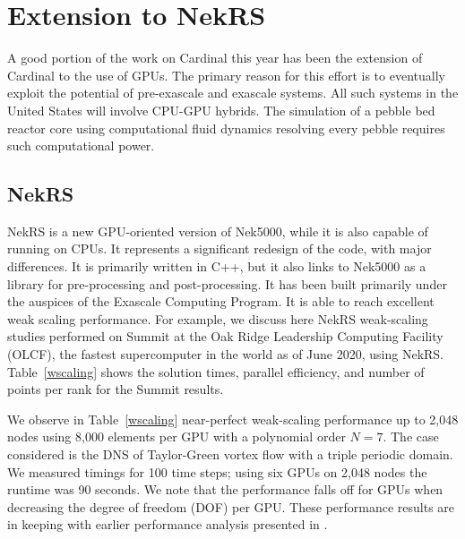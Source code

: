 \section{Extension to NekRS}
\label{s:nrs}

A good portion of the work on Cardinal this year has been the extension of Cardinal to the use of GPUs. The primary reason for this effort is to eventually exploit the potential of pre-exascale and exascale systems.
All such systems in the United States will involve CPU-GPU hybrids. The simulation of a pebble bed reactor core using computational fluid dynamics resolving every pebble requires such computational power.

\subsection{NekRS}

NekRS is a new GPU-oriented version of Nek5000, while it is also capable of running on CPUs. It represents a significant redesign of the code, with major differences. It is primarily written in C++, but it also links to Nek5000 as a library for pre-processing and post-processing. It has been built primarily under the auspices of the Exascale Computing Program. It is able to reach excellent weak scaling performance. For example, we discuss here NekRS weak-scaling studies performed on Summit at the Oak Ridge Leadership Computing Facility (OLCF), the fastest supercomputer in the world as of June 2020, using NekRS. Table~\ref{wscaling} shows the solution times, parallel efficiency, and number of points per rank for the Summit results.

We observe in Table~\ref{wscaling} near-perfect weak-scaling performance up to 2,048 nodes using 8,000 elements per GPU with a polynomial order  $N=7$. The case considered is the DNS of Taylor-Green vortex flow with a triple periodic domain. We measured timings for 100 time steps; using six GPUs on 2,048 nodes the runtime was 90 seconds. 
We note that the performance falls off for GPUs when decreasing the degree of freedom (DOF) per GPU.  
These performance results are in keeping with earlier performance analysis presented in \cite{fischer15,min2015a}.

